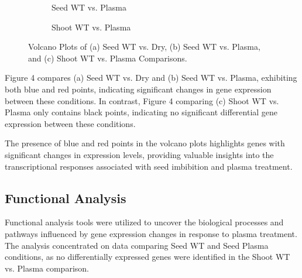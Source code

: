 \documentclass[12pt,letterpaper]{article}
\begin{document}
\begin{figure}[H]
\begin{subfigure}[b]{0.32\textwidth}
    \caption{Seed WT vs. Plasma}
    \label{fig:enter-label}
\end{subfigure}
\begin{subfigure}[b]{0.32\textwidth}
    \centering
    \caption{Shoot WT vs. Plasma}
    \label{fig:enter-label}
\end{subfigure}
\caption{Volcano Plots of (a) Seed WT vs. Dry, (b) Seed WT vs. Plasma, and (c) Shoot WT vs. Plasma Comparisons.}
\end{figure}

Figure 4 compares (a) Seed WT vs. Dry and (b) Seed WT vs. Plasma, exhibiting both blue and red points, indicating significant changes in gene expression between these conditions. In contrast, Figure 4 comparing (c) Shoot WT vs. Plasma only contains black points, indicating no significant differential gene expression between these conditions.

The presence of blue and red points in the volcano plots highlights genes with significant changes in expression levels, providing valuable insights into the transcriptional responses associated with seed imbibition and plasma treatment.

\subsection{Functional Analysis}
Functional analysis tools were utilized to uncover the biological processes and pathways influenced by gene expression changes in response to plasma treatment. The analysis concentrated on data comparing Seed WT and Seed Plasma conditions, as no differentially expressed genes were identified in the Shoot WT vs. Plasma comparison.
\end{document}
